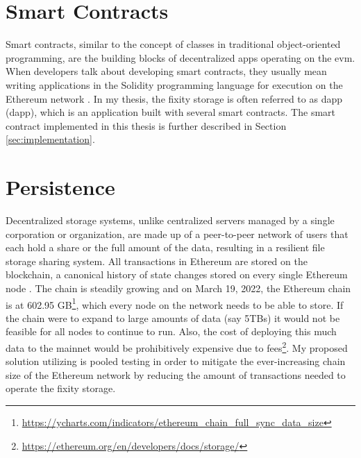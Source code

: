 \section{Smart Contracts}
Smart contracts, similar to the concept of classes in traditional object-oriented programming, are the building blocks of decentralized apps operating on the \acrshort{evm}. When developers talk about developing smart contracts, they usually mean writing applications in the Solidity programming language for execution on the Ethereum network \cite[10]{dannen2017introducing}.
In my thesis, the fixity storage is often referred to as \acrlong{dapp} (\acrshort{dapp}), which is an application built with several smart contracts. The smart contract implemented in this thesis is further described in Section \ref{sec:implementation}. 

\section{Persistence}\label{sec:persistence}
Decentralized storage systems, unlike centralized servers managed by a single corporation or organization, are made up of a peer-to-peer network of users that each hold a share or the full amount of the data, resulting in a resilient file storage sharing system. All transactions in Ethereum are stored on the blockchain, a canonical history of state changes stored on every single Ethereum node \cite[12]{dannen2017introducing}. 
The chain is steadily growing and on March 19, 2022, the Ethereum chain is at 602.95 GB\footnote{\url{https://ycharts.com/indicators/ethereum_chain_full_sync_data_size}}, which every node on the network needs to be able to store. If the chain were to expand to large amounts of data (say 5TBs) it would not be feasible for all nodes to continue to run. Also, the cost of deploying this much data to the mainnet would be prohibitively expensive due to fees\footnote{\url{https://ethereum.org/en/developers/docs/storage/}}.
My proposed solution utilizing is pooled testing in order to mitigate the ever-increasing chain size of the Ethereum network by reducing the amount of transactions needed to operate the fixity storage. 

